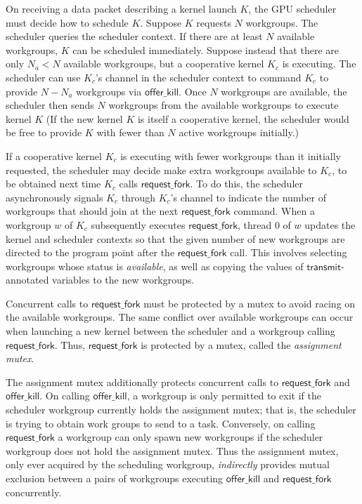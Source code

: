 \documentclass[parskip=half,sigconf,review, anonymous=true, acmcopyrightmode=none]{acmart}
\newcommand{\KC}{\mathit{KC}}
\newcommand{\transmit}{\mathsf{transmit}}
\newcommand{\offerfork}{\mathsf{request\_fork}}
\newcommand{\offerkill}{\mathsf{offer\_kill}}
\begin{document}
On receiving a data packet describing a kernel launch $K$, the GPU
scheduler must decide how to schedule $K$. Suppose $K$ requests $N$
workgroups. The scheduler queries the scheduler context.  If there are
at least $N$ available workgroups, $K$ can be scheduled
immediately. Suppose instead that there are only $N_a < N$ available
workgroups, but a cooperative kernel $K_c$ is executing. The scheduler
can use $K_c$'s channel in the scheduler context to command $K_c$ to
provide $N - N_a$ workgroups via $\offerkill$.  Once $N$ workgroups
are available,
the scheduler then sends $N$ workgroups from the available workgroups
to execute kernel $K$
(If the new kernel $K$ is itself a cooperative kernel, the scheduler
would be free to provide $K$ with fewer than $N$ active workgroups
initially.)

If a cooperative kernel $K_c$ is executing with fewer workgroups than
it initially requested, the scheduler may decide make extra workgroups
available to $K_c$, to be obtained next time $K_c$ calls $\offerfork$.
To do this, the scheduler asynchronously signals $K_c$ through $K_c$'s
channel to indicate the number of workgroups that should join at the
next $\offerfork$ command.  When a workgroup $w$ of $K_c$ subsequently
executes $\offerfork$, thread 0 of $w$ updates the kernel and
scheduler contexts so that the given number of new workgroups are
directed to the program point after the $\offerfork$ call.  This
involves selecting workgroups whose status is \emph{available}, as
well as copying the values of $\transmit$-annotated variables to the
new workgroups.

%
Concurrent calls to $\offerfork$ must be protected by a mutex to avoid
racing on the available workgroups. The same conflict over available
workgroups can occur when launching a new kernel between the scheduler
and a workgroup calling $\offerfork$. Thus, $\offerfork$ is protected
by a mutex, called the \emph{assignment mutex}. 

The assignment mutex additionally protects concurrent calls to
$\offerfork$ and $\offerkill$.  On calling $\offerkill$, a workgroup
is only permitted to exit if the scheduler workgroup currently holds
the assignment mutex; that is, the scheduler is trying to obtain work
groups to send to a task.  Conversely, on calling $\offerfork$ a
workgroup can only spawn new workgroups if the scheduler workgroup
does not hold the assignment mutex.  Thus the assignment mutex, only
ever acquired by the scheduling workgroup, \emph{indirectly} provides
mutual exclusion between a pairs of workgroups executing $\offerkill$
and $\offerfork$ concurrently.
\end{document}

